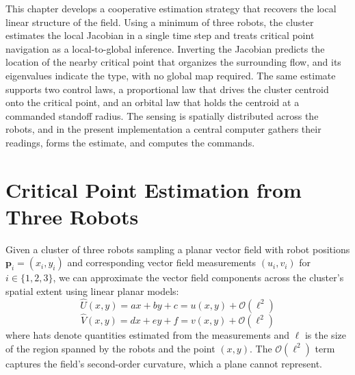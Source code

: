 This chapter develops a cooperative estimation strategy that recovers the local linear structure of the field. Using a minimum of three robots, the cluster estimates the local Jacobian in a single time step and treats critical point navigation as a local-to-global inference. Inverting the Jacobian predicts the location of the nearby critical point that organizes the surrounding flow, and its eigenvalues indicate the type, with no global map required. The same estimate supports two control laws, a proportional law that drives the cluster centroid onto the critical point, and an orbital law that holds the centroid at a commanded standoff radius. The sensing is spatially distributed across the robots, and in the present implementation a central computer gathers their readings, forms the estimate, and computes the commands.

\section{Critical Point Estimation from Three Robots}
\label{sec:ch6:estimation}

Given a cluster of three robots sampling a planar vector field with robot positions $\mathbf{p}_i = (x_i, y_i)$ and corresponding vector field measurements $(u_i, v_i)$ for $i \in \{1, 2, 3\}$, we can approximate the vector field components across the cluster's spatial extent using linear planar models:
\begin{equation}\label{eq:ch6:2}
\hat{U}(x,y) = ax + by + c = u(x,y) + \mathcal{O}(\ell^2)
\end{equation}
\begin{equation}\label{eq:ch6:3}
\hat{V}(x,y) = dx + ey + f = v(x,y) + \mathcal{O}(\ell^2)
\end{equation}
where hats denote quantities estimated from the measurements and $\ell$ is the size of the region spanned by the robots and the point $(x,y)$. The $\mathcal{O}(\ell^2)$ term captures the field's second-order curvature, which a plane cannot represent.

